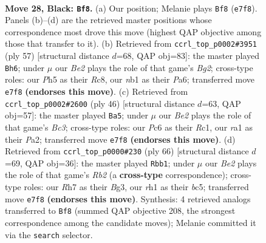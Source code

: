 \documentclass[11pt]{article}
\begin{document}
\clearpage

\begin{figure}[p]\centering
\begin{subfigure}{0.46\textwidth}\centering
\resizebox{\linewidth}{!}{%
\newchessgame
\chessboard[
  setfen={1rbk4/p1p1bp1r/P1p3p1/2P4p/1P3P1P/8/3B4/RN2K2R b Q - 4 28},
  showmover=false,
  pgfstyle=straightmove, color=movearrow, markmove={e7-f8}
]}
\caption{}
\end{subfigure}\hfill
\begin{subfigure}{0.46\textwidth}\centering
\resizebox{\linewidth}{!}{%
\newchessgame
\chessboard[
  setfen={2r1r1k1/1p3pbb/p2p4/3P1P2/P1p1P1Pp/2P1R2B/3N4/2R3K1 b - - 0 29},
  showmover=false,
  pgfstyle=straightmove, color=movearrow, markmove={g7-h6}
]}
\caption{}
\end{subfigure}
\\[4pt]
\begin{subfigure}{0.46\textwidth}\centering
\resizebox{\linewidth}{!}{%
\newchessgame
\chessboard[
  setfen={1rr5/p3k3/4ppp1/1bb4p/2p4P/2B1P1P1/PP1RBP2/2R3K1 w - - 5 24},
  showmover=false,
  pgfstyle=straightmove, color=movearrow, markmove={c3-a5}
]}
\caption{}
\end{subfigure}\hfill
\begin{subfigure}{0.46\textwidth}\centering
\resizebox{\linewidth}{!}{%
\newchessgame
\chessboard[
  setfen={4r3/3nr1k1/1p4p1/p1bP1p1p/P1P4P/3B1PB1/1R4K1/3R4 w - - 4 34},
  showmover=false,
  pgfstyle=straightmove, color=movearrow, markmove={b2-b1}
]}
\caption{}
\end{subfigure}
\caption{\textbf{Move 28, Black: \texttt{Bf8}.} (a) Our position; Melanie plays \texttt{Bf8} (\texttt{e7f8}). Panels (b)--(d) are the retrieved master positions whose correspondence most drove this move (highest QAP objective among those that transfer to it). (b) Retrieved from \texttt{ccrl\_top\_p0002\#3951} (ply 57) [structural distance $d$=68, QAP obj=83]: the master played \texttt{Bh6}; under $\mu$ our \emph{Be2} plays the role of that game's \emph{Bg2}; cross-type roles: our \emph{P}h5 as their \emph{R}c8, our \emph{n}b1 as their \emph{P}a6; transferred move \texttt{e7f8} \textbf{(endorses this move)}. (c) Retrieved from \texttt{ccrl\_top\_p0002\#2600} (ply 46) [structural distance $d$=63, QAP obj=57]: the master played \texttt{Ba5}; under $\mu$ our \emph{Be2} plays the role of that game's \emph{Bc3}; cross-type roles: our \emph{P}c6 as their \emph{R}c1, our \emph{r}a1 as their \emph{P}a2; transferred move \texttt{e7f8} \textbf{(endorses this move)}. (d) Retrieved from \texttt{ccrl\_top\_p0000\#230} (ply 66) [structural distance $d$=69, QAP obj=36]: the master played \texttt{Rbb1}; under $\mu$ our \emph{Be2} plays the role of that game's \emph{Rb2} (a \textbf{cross-type} correspondence); cross-type roles: our \emph{R}h7 as their \emph{B}g3, our \emph{r}h1 as their \emph{b}c5; transferred move \texttt{e7f8} \textbf{(endorses this move)}. Synthesis: 4 retrieved analogs transferred to \texttt{Bf8} (summed QAP objective 208, the strongest correspondence among the candidate moves); Melanie committed it via the \texttt{search} selector.}
\label{fig:thought-m55}
\end{figure}
\end{document}
